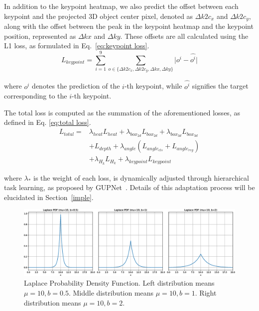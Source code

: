 \documentclass[journal]{IEEEtran}
\begin{document}
	In addition to the keypoint heatmap, we also predict the offset between each keypoint and the projected 3D object center pixel, denoted as $\Delta k2c_x$ and $\Delta k2c_y$, along with the offset between the peak in the keypoint heatmap and the keypoint position, represented as $\Delta kx$ and $\Delta ky$. These offsets are all calculated using the L1 loss, as formulated in Eq.~\eqref{eq:keypoint loss}.
	\begin{equation}
		L_{keypoint} = \sum_{i=1}^{9}\sum_{o\in \{\Delta k2c_x, \Delta k2c_y, \Delta kx, \Delta ky\}}\lvert o^i - \hat{o^i} \rvert
		\label{eq:keypoint loss}
	\end{equation}
	
	where $o^i$ denotes the prediction of the $i$-th keypoint, while $\hat{o^i}$ signifies the target corresponding to the $i$-th keypoint.
	
	The total loss is computed as the summation of the aforementioned losses, as defined in Eq. \eqref{eq:total loss}.
	\begin{equation}
	\begin{aligned}
		L_{total} =& \lambda_{heat}L_{heat} + \lambda_{box_{2d}}L_{box_{2d}} + \lambda_{box_{3d}}L_{box_{3d}}\\ 
		&+ L_{depth} +\lambda_{angle}(L_{angle_{cls}} + L_{angle_{reg}})\\ 
		&+ \lambda_{H_k}L_{H_k} + \lambda_{keypoint}L_{keypoint}
		\label{eq:total loss}
	\end{aligned}
	\end{equation}

	where $\lambda_*$ is the weight of each loss, is dynamically adjusted through hierarchical task learning, as proposed by GUPNet~\cite{gupnet}. Details of this adaptation process will be elucidated in Section~\ref{imple}.
	

	
	\begin{figure}[!t]
		\centering
		\includegraphics[width=1.0\linewidth]{Figures/laplace/laplace_distribution}
		\caption{Laplace Probability Density Function. Left distribution means $\mu=10, b=0.5$. Middle distribution means $\mu=10, b=1$. Right distribution means $\mu=10, b=2$.}
		\label{fig:laplace distribution}
	\end{figure}
\end{document}
